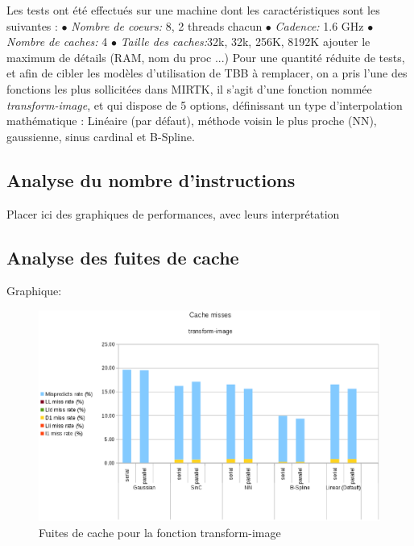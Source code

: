 \documentclass[10pt]{report}
\begin{document}
	
	Les tests ont été effectués sur une machine dont les caractéristiques sont les suivantes : \newline
	{$\bullet$} \textit{Nombre de coeurs:} 8, 2 threads chacun\newline
	{$\bullet$} \textit{Cadence:} 1.6 GHz \newline
	{$\bullet$} \textit{Nombre de caches:} 4 \newline
	{$\bullet$} \textit{Taille des caches:}32k, 32k, 256K, 8192K \newline
	ajouter le maximum de détails (RAM, nom du proc ...)\newline
	Pour une quantité réduite de tests, et afin de cibler les modèles d'utilisation de TBB à remplacer, on a pris l'une des fonctions les plus sollicitées dans MIRTK, il s'agit d'une fonction nommée \textit{transform-image}, et qui dispose de 5 options, définissant un type d'interpolation mathématique : Linéaire (par défaut), méthode voisin le plus proche (NN), gaussienne, sinus cardinal et B-Spline. 
	
	\subsection{Analyse du nombre d'instructions}
	
	Placer ici des graphiques de performances, avec leurs interprétation
	\subsection{Analyse des fuites de cache}
	Graphique: 
		\begin{figure}[h!]
			\begin{center}
				\includegraphics[width=15cm]{Reports/figures/cache_misses_transform_image.eps}
			\end{center}	
			\caption{Fuites de cache pour la fonction transform-image}
			\label{Fuites de cache pour la fonction transform-image}
		\end{figure}
	
\end{document}
